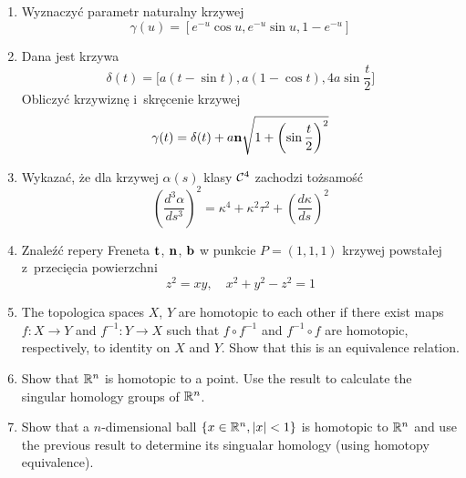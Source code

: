 \documentclass[a4paper,11pt]{article}
\begin{document}
\begin{enumerate}

\item Wyznaczyć parametr naturalny krzywej
  \begin{equation}
    \label{eq:DiffGeo-01}
    \gamma( u ) = \left[ e^{ -u } \cos u, e^{ -u } \sin u, 1 - e^{ -u } \right]
  \end{equation}

\item Dana jest krzywa
  \begin{equation}
    \label{eq:DiffGeo-02}
    \delta( t ) =
    \big[ a ( t - \sin t ), a ( 1 - \cos t ), 4a \sin \frac{ t }{ 2 } \big]
  \end{equation}
  Obliczyć krzywiznę i~skręcenie krzywej
  \begin{equation}
    \label{eq:DiffGeo-03}
    \gamma( t ) =
    \delta( t )
    + a \mathbf{n} \sqrt{ 1 + \left( \sin \frac{ t }{ 2 } \right)^{ 2 } }
  \end{equation}

\item Wykazać, że dla krzywej $\alpha( s )$ klasy $\mathcal{C}^{ 4 }$ zachodzi
  tożsamość
  \begin{equation}
    \label{eq:DiffGeo-04}
    \left( \frac{ d^{ 3 } \alpha }{ d s^{ 3 } } \right)^{ 2 } =
    \kappa^{ 4 } + \kappa^{ 2 } \tau^{ 2 } + \left( \frac{ d \kappa }{ d s } \right)^{ 2 }
  \end{equation}

\item Znaleźć repery Freneta $\mathbf{t}$, $\mathbf{n}$, $\mathbf{b}$ w
  punkcie $P = (1, 1, 1)$ krzywej powstałej z~przecięcia powierzchni
  \begin{equation}
    \label{eq:DiffGeo-05}
    z^{ 2 } = xy, \quad
    x^{ 2 } + y^{ 2 } - z^{ 2 } = 1
  \end{equation}

\item The topologica spaces $X$, $Y$ are homotopic to each other if
  there exist maps $f : X \to Y$ and $f^{ -1 } : Y \to X$ such that
  $f \circ f^{ -1 }$ and $f^{ -1 } \circ f$ are homotopic,
  respectively, to identity on $X$ and $Y$. Show that this is an
  equivalence relation.

\item Show that $\mathbb{R}^{ n }$ is homotopic to a point. Use the result
  to calculate the singular homology groups of $\mathbb{R}^{ n }$.

\item Show that a $n$-dimensional ball
  $\{ x \in \mathbb{R}^{ n }, \lvert{  x  }\rvert < 1 \}$ is homotopic to $\mathbb{R}^{ n }$
  and use the previous result to determine its singualar homology
  (using homotopy equivalence).


\end{enumerate}
\end{document}
